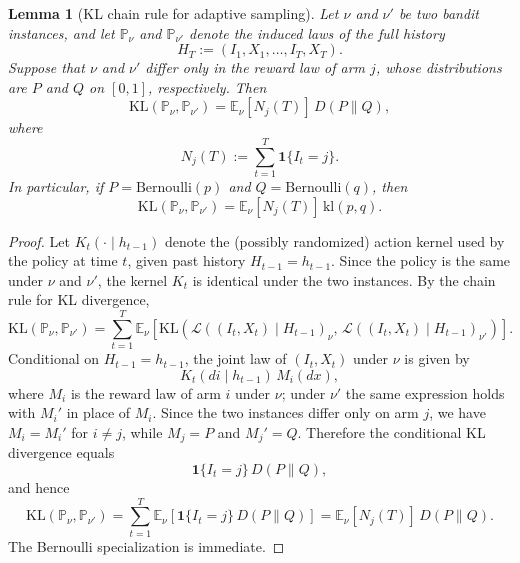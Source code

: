 \documentclass[
  12pt]{article}
\newtheorem{lemma}{Lemma}
\begin{document}
\begin{lemma}[KL chain rule for adaptive sampling]
\label{lem:kl-chain-rule}
Let $\nu$ and $\nu'$ be two bandit instances, and let $\mathbb P_\nu$ and
$\mathbb P_{\nu'}$ denote the induced laws of the full history
\[
H_T := (I_1,X_1,\dots,I_T,X_T).
\]
Suppose that $\nu$ and $\nu'$ differ only in the reward law of arm $j$, whose
distributions are $P$ and $Q$ on $[0,1]$, respectively. Then
\[
\mathrm{KL}(\mathbb P_\nu,\mathbb P_{\nu'})
=
\mathbb E_\nu[N_j(T)]\,D(P\|Q),
\]
where
\[
N_j(T):=\sum_{t=1}^T \mathbf 1\{I_t=j\}.
\]
In particular, if $P=\mathrm{Bernoulli}(p)$ and
$Q=\mathrm{Bernoulli}(q)$, then
\[
\mathrm{KL}(\mathbb P_\nu,\mathbb P_{\nu'})
=
\mathbb E_\nu[N_j(T)]\,\mathrm{kl}(p,q).
\]
\end{lemma}
\begin{proof}
Let $K_t(\cdot\mid h_{t-1})$ denote the (possibly randomized) action kernel
used by the policy at time $t$, given past history $H_{t-1}=h_{t-1}$.
Since the policy is the same under $\nu$ and $\nu'$, the kernel $K_t$
is identical under the two instances. By the chain rule for KL divergence,
\[
\mathrm{KL}(\mathbb P_\nu,\mathbb P_{\nu'})
=
\sum_{t=1}^T
\mathbb E_\nu\!\left[
\mathrm{KL}\!\left(
\mathcal L((I_t,X_t)\mid H_{t-1})_\nu,\,
\mathcal L((I_t,X_t)\mid H_{t-1})_{\nu'}
\right)\right].
\]
Conditional on $H_{t-1}=h_{t-1}$, the joint law of $(I_t,X_t)$ under $\nu$
is given by
\[
K_t(di\mid h_{t-1})\,M_i(dx),
\]
where $M_i$ is the reward law of arm $i$ under $\nu$; under $\nu'$ the same
expression holds with $M_i'$ in place of $M_i$.
Since the two instances differ only on arm $j$, we have $M_i=M_i'$ for
$i\neq j$, while $M_j=P$ and $M_j'=Q$.
Therefore the conditional KL divergence equals
\[
\mathbf 1\{I_t=j\}\,D(P\|Q),
\]
and hence
\[
\mathrm{KL}(\mathbb P_\nu,\mathbb P_{\nu'})
=
\sum_{t=1}^T
\mathbb E_\nu\!\left[\mathbf 1\{I_t=j\}\,D(P\|Q)\right]
=
\mathbb E_\nu[N_j(T)]\,D(P\|Q).
\]
The Bernoulli specialization is immediate.
\end{proof}
\end{document}
